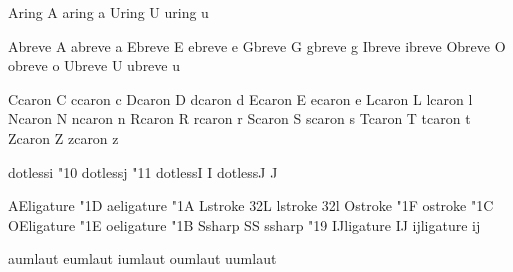  Aring {A}
 aring {a}
 Uring {U}
 uring {u}

 Abreve {\buildtextaccent\textbreve A}
 abreve {\buildtextaccent\textbreve a}
 Ebreve {\buildtextaccent\textbreve E}
 ebreve {\buildtextaccent\textbreve e}
 Gbreve {\buildtextaccent\textbreve G}
 gbreve {\buildtextaccent\textbreve g}
 Ibreve {\buildtextaccent\textbreve \dotlessI}
 ibreve {\buildtextaccent\textbreve \dotlessi}
 Obreve {\buildtextaccent\textbreve O}
 obreve {\buildtextaccent\textbreve o}
 Ubreve {\buildtextaccent\textbreve U}
 ubreve {\buildtextaccent\textbreve u}

 Ccaron {\buildtextaccent\textcaron C}
 ccaron {\buildtextaccent\textcaron c}
 Dcaron {\buildtextaccent\textcaron D}
 dcaron {\buildtextaccent\textcaron d}
 Ecaron {\buildtextaccent\textcaron E}
 ecaron {\buildtextaccent\textcaron e}
 Lcaron {\buildtextaccent\textcaron L}
 lcaron {\buildtextaccent\textcaron l}
 Ncaron {\buildtextaccent\textcaron N}
 ncaron {\buildtextaccent\textcaron n}
 Rcaron {\buildtextaccent\textcaron R}
 rcaron {\buildtextaccent\textcaron r}
 Scaron {\buildtextaccent\textcaron S}
 scaron {\buildtextaccent\textcaron s}
 Tcaron {\buildtextaccent\textcaron T}
 tcaron {\buildtextaccent\textcaron t}
 Zcaron {\buildtextaccent\textcaron Z}
 zcaron {\buildtextaccent\textcaron z}

 dotlessi    {\char"10 }
 dotlessj    {\char"11 }
 dotlessI    {I}
 dotlessJ    {J}

 AEligature  {\char"1D }
 aeligature  {\char"1A }
 Lstroke     {\char32L}
 lstroke     {\char32l}
 Ostroke     {\char"1F }
 ostroke     {\char"1C }
 OEligature  {\char"1E }
 oeligature  {\char"1B }
 Ssharp      {SS}
 ssharp      {\char"19 }
 IJligature  {IJ}
 ijligature  {ij}

 aumlaut {\moveaccent{-.1ex}\adiaeresis}
 eumlaut {\moveaccent{-.1ex}\ediaeresis}
 iumlaut {\moveaccent{-.1ex}\idiaeresis}
 oumlaut {\moveaccent{-.1ex}\odiaeresis}
 uumlaut {\moveaccent{-.1ex}\udiaeresis}

